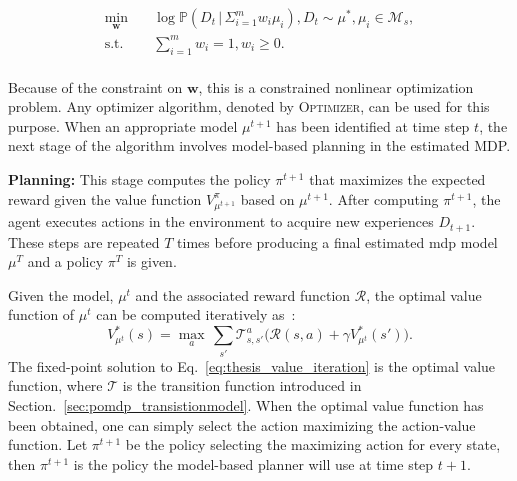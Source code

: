 \begin{equation}\label{eq:thesis_constrained_likelihood}
\begin{aligned}
\underset{\bm{w}}{\min} \quad &\log \mathbb{P}(D_t \, | \, \Sigma_{i=1}^m w_i \mu_i), D_t \sim \mu^{*}, \mu_i\in\mathcal{M}_s,\\
\textrm{s.t.} \quad & \sum_{i=1}^m w_i = 1, w_i\geq0.\\
\end{aligned}
\end{equation}

Because of the constraint on $\bm{w}$, this is a constrained nonlinear optimization problem. Any optimizer algorithm, denoted by \textsc{Optimizer}, can be used for this purpose.
When an appropriate model $\mu^{t+1}$ has been identified at time step $t$, the next stage of the algorithm involves model-based planning in the estimated MDP.

\noindent\textbf{Planning:}
This stage computes the policy $\pi^{t+1}$ that maximizes the expected reward given the value function $V_{\mu^{t+1}}^\pi$ based on $\mu^{t+1}$. 
After computing $\pi^{t+1}$, the agent executes actions in the environment to acquire new experiences $D_{t+1}$. These steps are repeated $T$ times before producing a final estimated \gls{mdp} model $\mu^T$ and a policy $\pi^T$ is given.

Given the model, $\mu^t$ and the associated reward function $\mathcal{R}$, the optimal value function of $\mu^t$ can be computed iteratively as~\citep{Sutton2018}:
\begin{equation}\label{eq:thesis_value_iteration}
    V_{\mu^t}^{*}(s) = \underset{a}{\max} \, \sum_{s'}\mathcal{T}_{s,s'}^a\Big(\mathcal{R}(s,a)+\gamma V_{\mu^t}^{*}(s')\Big).
\end{equation}
The fixed-point solution to Eq.~\eqref{eq:thesis_value_iteration} is the optimal value function, where $\mathcal{T}$ is the transition function introduced in Section.~\ref{sec:pomdp_transistionmodel}. When the optimal value function has been obtained, one can simply select the action maximizing the action-value function. Let $\pi^{t+1}$ be the policy selecting the maximizing action for every state, then $\pi^{t+1}$ is the policy the model-based planner will use at time step $t+1$.


